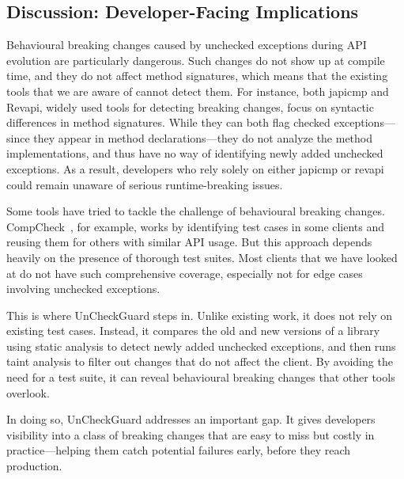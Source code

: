 \subsection{Discussion: Developer-Facing Implications}

Behavioural breaking changes caused by unchecked exceptions during API evolution are particularly dangerous. Such changes do not show up at compile time, and they do not affect method signatures, which means that the existing tools that we are aware of cannot detect them. For instance, both japicmp and Revapi, widely used tools for detecting breaking changes, focus on syntactic differences in method signatures. While they can both flag checked exceptions—since they appear in method declarations—they do not analyze the method implementations, and thus have no way of identifying newly added unchecked exceptions. As a result, developers who rely solely on either japicmp or revapi could remain unaware of serious runtime-breaking issues.

Some tools have tried to tackle the challenge of behavioural breaking changes. CompCheck~\cite{CompCheck}, for example, works by identifying test cases in some clients and reusing them for others with similar API usage. But this approach depends heavily on the presence of thorough test suites. Most clients that we have looked at do not have such comprehensive coverage, especially not for edge cases involving unchecked exceptions.

This is where UnCheckGuard steps in. Unlike existing work, it does not rely on existing test cases. Instead, it compares the old and new versions of a library using static analysis to detect newly added unchecked exceptions, and then runs taint analysis to filter out changes that do not affect the client. By avoiding the need for a test suite, it can reveal behavioural breaking changes that other tools overlook.

In doing so, UnCheckGuard addresses an important gap. It gives developers visibility into a class of breaking changes that are easy to miss but costly in practice—helping them catch potential failures early, before they reach production.
